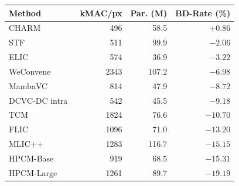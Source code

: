 \begin{tabular}{lrrr}
\toprule
Method & kMAC/px & Par. (M) & BD-Rate (\%) \\
\midrule
CHARM~\cite{charm} & 496 & 58.5 & $+0.86$ \\
STF~\cite{stf} & 511 & 99.9 & $-2.06$ \\
ELIC~\cite{elic} & 574 & 36.9 & $-3.22$ \\
WeConvene~\cite{weconvene} & 2343 & 107.2 & $-6.98$ \\
MambaVC~\cite{mambavc} & 814 & 47.9 & $-8.72$ \\
DCVC-DC intra~\cite{dcvcdc} & 542 & 45.5 & $-9.18$ \\
TCM~\cite{tcm} & 1824 & 76.6 & $-10.70$ \\
FLIC~\cite{flic} & 1096 & 71.0 & $-13.20$ \\
MLIC++~\cite{mlicpp} & 1283 & 116.7 & $-15.15$ \\
HPCM-Base~\cite{hpcm} & 919 & 68.5 & $-15.31$ \\
HPCM-Large~\cite{hpcm} & 1261 & 89.7 & $-19.19$ \\
\bottomrule
\end{tabular}

